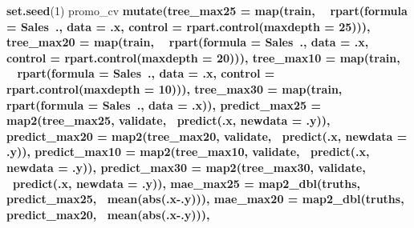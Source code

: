 \documentclass[]{article}
\newenvironment{Shaded}{\begin{snugshade}}{\end{snugshade}}
\newcommand{\DataTypeTok}[1]{\textcolor[rgb]{0.13,0.29,0.53}{#1}}
\newcommand{\DecValTok}[1]{\textcolor[rgb]{0.00,0.00,0.81}{#1}}
\newcommand{\KeywordTok}[1]{\textcolor[rgb]{0.13,0.29,0.53}{\textbf{#1}}}
\newcommand{\NormalTok}[1]{#1}
\newcommand{\OperatorTok}[1]{\textcolor[rgb]{0.81,0.36,0.00}{\textbf{#1}}}
\newcommand{\StringTok}[1]{\textcolor[rgb]{0.31,0.60,0.02}{#1}}
\begin{document}
\begin{Shaded}
\begin{Highlighting}[]
\KeywordTok{set.seed}\NormalTok{(}\DecValTok{1}\NormalTok{)}
\NormalTok{promo_cv }\OperatorTok{%>%}\StringTok{ }
\StringTok{  }\KeywordTok{mutate}\NormalTok{(}\DataTypeTok{tree_max25 =} \KeywordTok{map}\NormalTok{(train, }\OperatorTok{~}\StringTok{ }\KeywordTok{rpart}\NormalTok{(}\DataTypeTok{formula =}\NormalTok{ Sales}\OperatorTok{~}\NormalTok{., }\DataTypeTok{data =}\NormalTok{ .x, }\DataTypeTok{control =} \KeywordTok{rpart.control}\NormalTok{(}\DataTypeTok{maxdepth =} \DecValTok{25}\NormalTok{))),}
         \DataTypeTok{tree_max20 =} \KeywordTok{map}\NormalTok{(train, }\OperatorTok{~}\StringTok{ }\KeywordTok{rpart}\NormalTok{(}\DataTypeTok{formula =}\NormalTok{ Sales}\OperatorTok{~}\NormalTok{., }\DataTypeTok{data =}\NormalTok{ .x, }\DataTypeTok{control =} \KeywordTok{rpart.control}\NormalTok{(}\DataTypeTok{maxdepth =} \DecValTok{20}\NormalTok{))),}
         \DataTypeTok{tree_max10 =} \KeywordTok{map}\NormalTok{(train, }\OperatorTok{~}\StringTok{ }\KeywordTok{rpart}\NormalTok{(}\DataTypeTok{formula =}\NormalTok{ Sales}\OperatorTok{~}\NormalTok{., }\DataTypeTok{data =}\NormalTok{ .x, }\DataTypeTok{control =} \KeywordTok{rpart.control}\NormalTok{(}\DataTypeTok{maxdepth =} \DecValTok{10}\NormalTok{))),}
         \DataTypeTok{tree_max30 =} \KeywordTok{map}\NormalTok{(train, }\OperatorTok{~}\StringTok{ }\KeywordTok{rpart}\NormalTok{(}\DataTypeTok{formula =}\NormalTok{ Sales}\OperatorTok{~}\NormalTok{., }\DataTypeTok{data =}\NormalTok{ .x)),}
         \DataTypeTok{predict_max25 =} \KeywordTok{map2}\NormalTok{(tree_max25, validate, }\OperatorTok{~}\KeywordTok{predict}\NormalTok{(.x, }\DataTypeTok{newdata =}\NormalTok{ .y)),}
         \DataTypeTok{predict_max20 =} \KeywordTok{map2}\NormalTok{(tree_max20, validate, }\OperatorTok{~}\KeywordTok{predict}\NormalTok{(.x, }\DataTypeTok{newdata =}\NormalTok{ .y)),}
         \DataTypeTok{predict_max10 =} \KeywordTok{map2}\NormalTok{(tree_max10, validate, }\OperatorTok{~}\KeywordTok{predict}\NormalTok{(.x, }\DataTypeTok{newdata =}\NormalTok{ .y)),}
         \DataTypeTok{predict_max30 =} \KeywordTok{map2}\NormalTok{(tree_max30, validate, }\OperatorTok{~}\KeywordTok{predict}\NormalTok{(.x, }\DataTypeTok{newdata =}\NormalTok{ .y)),}
         \DataTypeTok{mae_max25 =} \KeywordTok{map2_dbl}\NormalTok{(truths, predict_max25, }\OperatorTok{~}\KeywordTok{mean}\NormalTok{(}\KeywordTok{abs}\NormalTok{(.x}\OperatorTok{-}\NormalTok{.y))),}
         \DataTypeTok{mae_max20 =} \KeywordTok{map2_dbl}\NormalTok{(truths, predict_max20, }\OperatorTok{~}\KeywordTok{mean}\NormalTok{(}\KeywordTok{abs}\NormalTok{(.x}\OperatorTok{-}\NormalTok{.y))),}
}
\end{Highlighting}
\end{Shaded}
\end{document}
